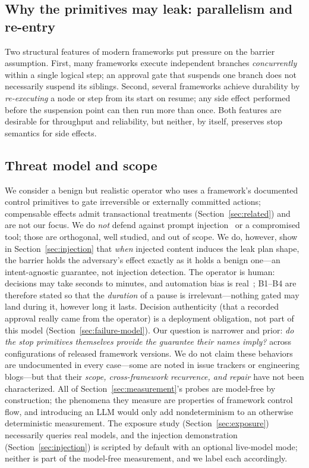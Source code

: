 \documentclass[10pt,journal,compsoc]{IEEEtran}
\begin{document}
\subsection{Why the primitives may leak: parallelism and re-entry}
Two structural features of modern frameworks put pressure on the barrier
assumption. First, many frameworks execute independent branches
\emph{concurrently} within a single logical step; an approval gate that suspends
one branch does not necessarily suspend its siblings. Second, several frameworks
achieve durability by \emph{re-executing} a node or step from its start on
resume; any side effect performed before the suspension point can then run more
than once. Both features are desirable for throughput and reliability, but
neither, by itself, preserves stop semantics for side effects.

\subsection{Threat model and scope}
\label{sec:scope}
We consider a benign but realistic operator who uses a framework's documented
control primitives to gate irreversible or externally committed actions;
compensable effects admit transactional treatments
(Section~\ref{sec:related}) and are not our focus. We do \emph{not} defend against prompt
injection~\cite{greshake23} or a compromised tool; those are orthogonal, well
studied, and out of scope. We do, however, show in
Section~\ref{sec:injection} that \emph{when} injected content induces the
leak plan shape, the barrier holds the adversary's effect exactly as it holds
a benign one---an intent-agnostic guarantee, not injection detection. The operator is human: decisions may take seconds to
minutes, and automation bias is real~\cite{parasuraman97,cummings04}; B1--B4 are
therefore stated so that the \emph{duration} of a pause is irrelevant---nothing
gated may land during it, however long it lasts. Decision authenticity
(that a recorded approval really came from the operator) is a deployment
obligation, not part of this model (Section~\ref{sec:failure-model}).
Our question is narrower and prior:
\emph{do the stop primitives themselves provide the guarantee their names
imply?} across configurations of released framework versions. We do
not claim these behaviors are undocumented in every case---some are noted in
issue trackers or engineering blogs---but that their \emph{scope, cross-framework
recurrence, and repair} have not been characterized. All of
Section~\ref{sec:measurement}'s probes are model-free by construction; the
phenomena they measure are properties of framework control flow, and
introducing an LLM would only add nondeterminism to an otherwise
deterministic measurement. The exposure study (Section~\ref{sec:exposure})
necessarily queries real models, and the injection demonstration
(Section~\ref{sec:injection}) is scripted by default with an optional
live-model mode; neither is part of the model-free measurement, and we label
each accordingly.
\end{document}
